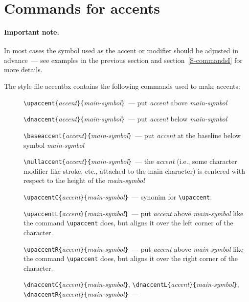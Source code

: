 \section{Commands for accents\label{S-commands}}

\paragraph{Important note.}
In most cases the symbol used as the accent or modifier
should be adjusted in advance~--- see examples in
the previous section and section~\ref{S-commandsI}
for more details.

\bigskip

\noindent
The style file {\sc accentbx}
contains the following commands used to make accents:
\begin{description}
\item[] \verb?\upaccent{?{\em accent}\verb?}{?{\em main-symbol}\verb?}?~---
   put {\em accent} above {\em main-symbol}
\item[] \verb?\dnaccent{?{\em accent}\verb?}{?{\em main-symbol}\verb?}?~---
   put {\em accent} below {\em main-symbol}
\item[] \verb?\baseaccent{?{\em accent}\verb?}{?{\em main-symbol}\verb?}?~---
   put {\em accent} at the baseline below symbol {\em main-symbol}
\item[] \verb?\nullaccent{?{\em accent}\verb?}{?{\em main-symbol}\verb?}?~---
   the {\em accent} (i.e., some character modifier like stroke, etc.,
   attached to the main character)
   is centered with respect to the height of the
   {\em main-symbol}
\item[] \verb?\upaccentC{?{\em accent}\verb?}{?{\em main-symbol}\verb?}?~---
   synonim for \verb?\upaccent?.
\item[] \verb?\upaccentL{?{\em accent}\verb?}{?{\em main-symbol}\verb?}?~---
   put {\em accent} above {\em main-symbol} like
   the command \verb?\upaccent? does,
   but aligns it over the left corner of the character.
\item[] \verb?\upaccentR{?{\em accent}\verb?}{?{\em main-symbol}\verb?}?~---
   put {\em accent} above {\em main-symbol} like
   the command \verb?\upaccent? does,
   but aligns it over the right corner of the character.
\item[] \verb?\dnaccentC{?{\em accent}\verb?}{?{\em main-symbol}\verb?}?,
        \verb?\dnaccentL{?{\em accent}\verb?}{?{\em main-symbol}\verb?}?,\\
        \verb?\dnaccentR{?{\em accent}\verb?}{?{\em main-symbol}\verb?}?~---

\end{description}

